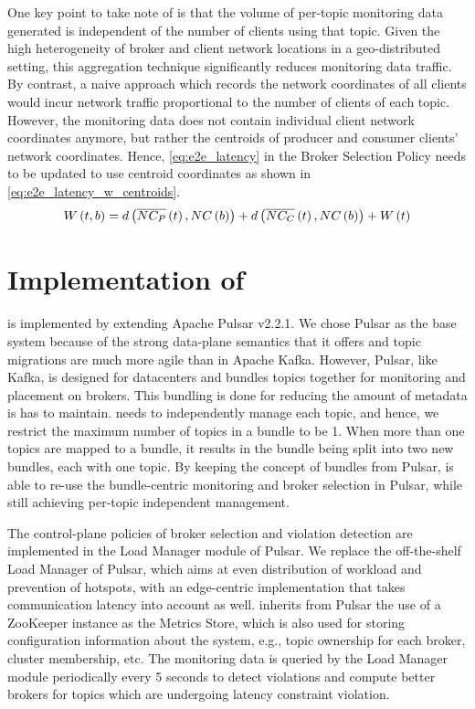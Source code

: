 \par One key point to take note of is that the volume of per-topic monitoring data generated is independent of the number of clients using that topic. Given the high heterogeneity of broker and client network locations in a geo-distributed setting, this aggregation technique significantly reduces monitoring data traffic. By contrast, a naive approach which records the network coordinates of all clients would incur network traffic proportional to the number of clients of each topic. However, the monitoring data does not contain individual client network coordinates anymore, but rather the centroids of producer and consumer clients' network coordinates. Hence, \cref{eq:e2e_latency} in the Broker Selection Policy needs to be updated to use centroid coordinates as shown in \cref{eq:e2e_latency_w_centroids}.
\begin{equation}
\label{eq:e2e_latency_w_centroids}
W \left( t, b\right) = d \left( \overline{NC_P} \left( t \right), NC \left( b \right) \right) + d \left( \overline{NC_C} \left( t \right), NC \left( b \right) \right) + W \left( t \right) 
\vspace{-0.05in}
\end{equation}

\section{Implementation of \epulsar{}}
\label{sec:epulsar_impl}
\epulsar{} is implemented by extending Apache Pulsar v2.2.1. We chose Pulsar as the base system because of the strong data-plane semantics that it offers and topic migrations are much more agile than in Apache Kafka. However, Pulsar, like Kafka, is designed for datacenters and bundles topics together for monitoring and placement on brokers. This bundling is done for reducing the amount of metadata is has to maintain. \epulsar{} needs to independently manage each topic, and hence, we restrict the maximum number of topics in a bundle to be 1. When more than one topics are mapped to a bundle, it results in the bundle being split into two new bundles, each with one topic. By keeping the concept of bundles from Pulsar, \epulsar{} is able to re-use the bundle-centric monitoring and broker selection in Pulsar, while still achieving per-topic independent management.
\par The control-plane policies of broker selection and violation detection are implemented in the Load Manager module of Pulsar. We replace the off-the-shelf Load Manager of Pulsar, which aims at even distribution of workload and prevention of hotspots, with an edge-centric implementation that takes communication latency into account as well. \epulsar{} inherits from Pulsar the use of a ZooKeeper instance as the Metrics Store, which is also used for storing configuration information about the system, e.g., topic ownership for each broker, cluster membership, etc. The monitoring data is queried by the Load Manager module periodically every 5 seconds to detect violations and compute better brokers for topics which are undergoing latency constraint violation.

